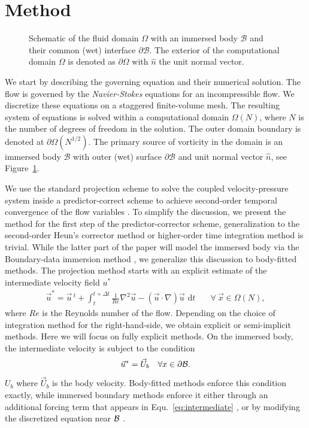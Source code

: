 \documentclass{article}
\begin{document}
\section{Method}

\begin{figure}
    \centering
    \def\svgwidth{0.8\columnwidth}
    
    \caption{Schematic of the fluid domain $\Omega$ with an immersed body $\mathcal{B}$ and their common (wet) interface $\partial\mathcal{B}$. The exterior of the computational domain $\Omega$ is denoted as $\partial\Omega$ with $\hat{n}$ the unit normal vector.}
    \label{Fig_1}
\end{figure}

We start by describing the governing equation and their numerical solution.
The flow is governed by the \emph{Navier-Stokes} equations for an incompressible flow. We discretize these equations on a staggered finite-volume mesh. The resulting system of equations is solved within a computational domain $\Omega(N)$, where $N$ is the number of degrees of freedom in the solution. The outer domain boundary is denoted at $\partial\Omega(N^{1/2})$. The primary source of vorticity in the domain is an immersed body $\mathcal{B}$ with outer (wet) surface $\partial\mathcal{B}$ and unit normal vector $\hat n$, see Figure~\ref{Fig_1}.

We use the standard projection scheme \cite{Chorin1967} to solve the coupled velocity-pressure system inside a predictor-correct scheme to achieve second-order temporal convergence of the flow variables \cite{Lauber2022}. 
To simplify the discussion, we present the method for the first step of the predictor-corrector scheme, generalization to the second-order Heun's corrector method or higher-order time integration method is trivial. While the latter part of the paper will model the immersed body via the Boundary-data immersion method \cite{Maertens2015}, we generalize this discussion to body-fitted methods.
The projection method starts with an explicit estimate of the intermediate velocity field $u^*$
\begin{align}\label{eq:intermediate}
    \vec{u}^* = \vec{u}\,^t + \int_{t}^{t+\Delta t}\frac{1}{Re}\nabla^2\vec{u} -\left(\vec{u}\cdot\nabla\right)\vec{u}\text{ d}t &\quad\forall\ \vec{x}\in\Omega (N),
\end{align}
where $Re$ is the Reynolds number of the flow. Depending on the choice of integration method for the right-hand-side, we obtain explicit or semi-implicit methods. Here we will focus on fully explicit methods. On the immersed body, the intermediate velocity is subject to the condition
\begin{equation}
    \vec{u}^* = \vec{U}_b \quad \forall x \in \partial\cal{B}.
\end{equation}$U_b$ 
where $\vec{U}_b$ is the body velocity. Body-fitted methods enforce this condition exactly, while immersed boundary methods enforce it either through an additional forcing term that appears in Equ.~\ref{eq:intermediate} \cite{Lauber2022}, or by modifying the discretized equation near $\cal{B}$ \cite{Direct-Forcing}.
\end{document}
